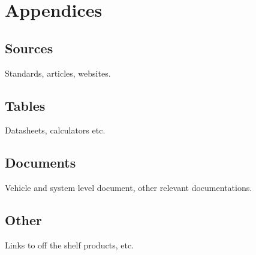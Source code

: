 \documentclass[12pt,a4paper]{article}
\begin{document}
	\section*{Appendices}
		\subsection*{Sources}
			Standards, articles, websites.
		\subsection*{Tables}
			Datasheets, calculators etc.
		\subsection*{Documents}
			Vehicle and system level document, other relevant documentations.
		\subsection*{Other}
			Links to off the shelf products, etc.
\end{document}
